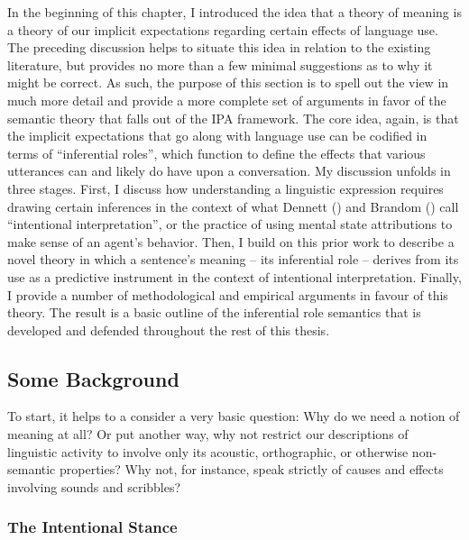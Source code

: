In the beginning of this chapter, I introduced the idea that a theory of meaning is a theory of our implicit expectations regarding certain effects of language use. The preceding discussion helps to situate this idea in relation to the existing literature, but provides no more than a few minimal suggestions as to why it might be correct. As such, the purpose of this section is to spell out the view in much more detail and provide a more complete set of arguments in favor of the semantic theory that falls out of the IPA framework. The core idea, again, is that the implicit expectations that go along with language use can be codified in terms of ``inferential roles'', which function to define the effects that various utterances can and likely do have upon a conversation. My discussion unfolds in three stages. First, I discuss how understanding a linguistic expression requires drawing certain inferences in the context of what Dennett (\citeyear{Dennett:1991,Dennett:1987}) and Brandom  (\citeyear{Brandom:1994,Brandom:2000,Brandom:2009}) call ``intentional interpretation'', or the practice of using mental state attributions to make sense of an agent's behavior. Then, I build on this prior work to describe a novel theory in which a sentence's meaning -- its inferential role -- derives from its use as a predictive instrument in the context of intentional interpretation. Finally, I provide a number of methodological and empirical arguments in favour of this theory. The result is a basic outline of the inferential role semantics that is developed and defended throughout the rest of this thesis. 

\subsection{Some Background}

To start, it helps to a consider a very basic question: Why do we need a notion of meaning at all? Or put another way, why not restrict our descriptions of linguistic activity to involve only its acoustic, orthographic, or otherwise non-semantic properties? Why not, for instance, speak strictly of causes and effects involving sounds and scribbles?

\subsubsection{The Intentional Stance}

